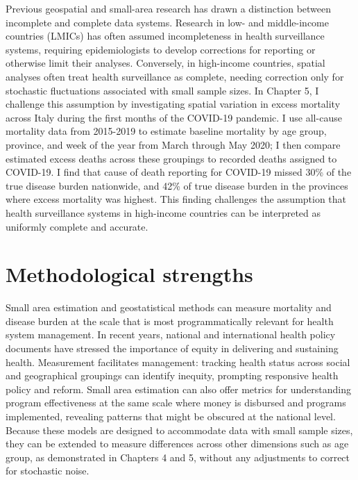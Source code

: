 \documentclass[
]{report}
\begin{document}
Previous geospatial and small-area research has drawn a distinction between incomplete and complete data systems. Research in low- and middle-income countries (LMICs) has often assumed incompleteness in health surveillance systems, requiring epidemiologists to develop corrections for reporting or otherwise limit their analyses.\autocite{Shaweno2018,Adair2018,Zeng2020} Conversely, in high-income countries, spatial analyses often treat health surveillance as complete, needing correction only for stochastic fluctuations associated with small sample sizes.\autocite{Papoila2014,Boing2020} In Chapter 5, I challenge this assumption by investigating spatial variation in excess mortality across Italy during the first months of the COVID-19 pandemic. I use all-cause mortality data from 2015-2019 to estimate baseline mortality by age group, province, and week of the year from March through May 2020; I then compare estimated excess deaths across these groupings to recorded deaths assigned to COVID-19. I find that cause of death reporting for COVID-19 missed 30\% of the true disease burden nationwide, and 42\% of true disease burden in the provinces where excess mortality was highest. This finding challenges the assumption that health surveillance systems in high-income countries can be interpreted as uniformly complete and accurate.

\hypertarget{methodological-strengths}{%
\section{Methodological strengths}\label{methodological-strengths}}

Small area estimation and geostatistical methods can measure mortality and disease burden at the scale that is most programmatically relevant for health system management. In recent years, national and international health policy documents have stressed the importance of equity in delivering and sustaining health.\autocite{IND_MOHFW2017,UgandaNationalTuberculosisandLeprosyProgramme2020a,Buyum2020} Measurement facilitates management: tracking health status across social and geographical groupings can identify inequity, prompting responsive health policy and reform.\autocite{Roberts2008,Frenk2006} Small area estimation can also offer metrics for understanding program effectiveness at the same scale where money is disbursed and programs implemented, revealing patterns that might be obscured at the national level. Because these models are designed to accommodate data with small sample sizes,\autocite{Diggle2016,Wakefield2019} they can be extended to measure differences across other dimensions such as age group, as demonstrated in Chapters 4 and 5, without any adjustments to correct for stochastic noise.
\end{document}
